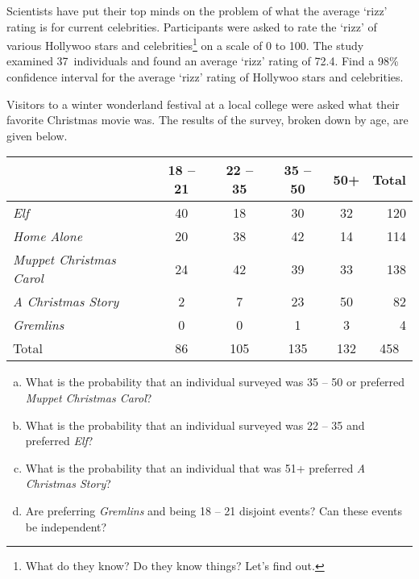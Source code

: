 \documentclass[12pt,letterpaper]{exam}
\begin{document}
\begin{questions}
\newpage
\question[10] Scientists have put their top minds on the problem of what the average `rizz' rating is for current celebrities. Participants were asked to rate the `rizz' of various Hollywoo stars and celebrities\footnote{What do they know? Do they know things? Let's find out.} on a scale of 0 to 100. The study examined 37~individuals and found an average `rizz' rating of 72.4. Find a 98\% confidence interval for the average `rizz' rating of Hollywoo stars and celebrities. 



\newpage
\question[10] Visitors to a winter wonderland festival at a local college were asked what their favorite Christmas movie was. The results of the survey, broken down by age, are given below. \par
	\begin{table}[H]
	\centering
	\begin{tabular}{|l|cccc|r|} \hline
	 & 18 -- 21 & 22 -- 35 & 35 -- 50 & 50+ & \multicolumn{1}{c|}{Total} \\ \hline
	\textit{Elf} & 40 & 18 & 30 & 32 & 120 \\
	\textit{Home Alone} & 20 & 38 & 42 & 14 & 114 \\
	\textit{Muppet Christmas Carol} & 24 & 42 & 39 & 33 & 138 \\
	\textit{A Christmas Story} & 2 & 7 & 23 & 50 & 82 \\
	\textit{Gremlins} & 0 & 0 & 1 & 3 & 4 \\ \hline
	Total & 86 & 105 & 135 & 132 & \multicolumn{1}{c|}{458} \\ \hline
	\end{tabular}
	\end{table} \par

\begin{enumerate}[(a)]
\item What is the probability that an individual surveyed was 35 -- 50 or preferred \textit{Muppet Christmas Carol}?
\item What is the probability that an individual surveyed was 22 -- 35 and preferred \textit{Elf}?
\item What is the probability that an individual that was 51+ preferred \textit{A Christmas Story}?
\item Are preferring \textit{Gremlins} and being 18 -- 21 disjoint events? Can these events be independent? 
\end{enumerate}


\end{questions}
\end{document}
